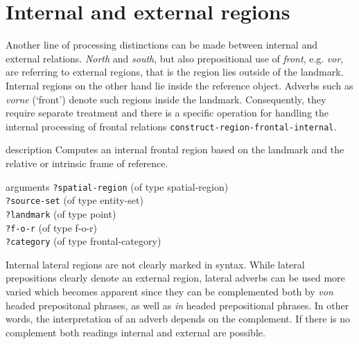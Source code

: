 \section{Internal and external regions}
Another line of processing distinctions can be made between internal 
and external relations. \textit{North} and \textit{south}, but also prepositional use
of \textit{front}, e.g. \textit{vor}, are referring to external regions, that is the
region lies outside of the landmark. Internal regions on the other
hand lie inside the reference object. Adverbs such as \textit{vorne} (`front')
denote such regions inside the landmark. Consequently, they require
separate treatment and there is a specific operation
for handling the internal processing of frontal relations 
{\footnotesize\tt construct-region-frontal-internal}.

\begin{explanation}{description}
Computes an internal frontal region based on the landmark
and the relative or intrinsic frame of reference.
\end{explanation}
\begin{explanation}{arguments}
{\footnotesize\verb+?spatial-region+} (of type spatial-region) \\
{\footnotesize\verb+?source-set+} (of type entity-set) \\
{\footnotesize\verb+?landmark+} (of type point)\\
{\footnotesize\verb+?f-o-r+} (of type f-o-r)\\
{\footnotesize\verb+?category+} (of type frontal-category)
\vspace{0.3cm}
\end{explanation}

Internal lateral regions are not clearly marked in syntax. 
While lateral prepositions clearly denote an external region, 
lateral adverbs can be used more varied which becomes apparent
since they can be complemented both by \textit{von} headed prepositonal
phrases, as well as \textit{in} headed prepositional phrases.
In other words, the interpretation of an adverb depends
on the complement. If there is no complement both readings
internal and external are possible. 

